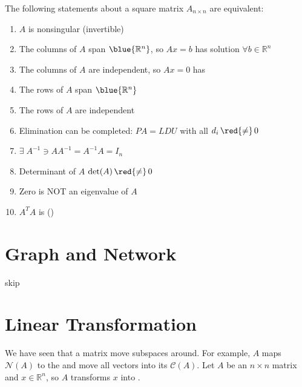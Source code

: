 \newpage

\begin{note}
    The following statements about a square matrix $A_{n \times n}$ are equivalent:
    \begin{enumerate}[label=(\arabic*)]
        \item $A$ is nonsingular (invertible)
        \item The columns of $A$ span $\blue{\mathbb{R}^n}$, so $Ax = b$ has  solution $\forall b \in \mathbb{R}^n$
        \item The columns of $A$ are independent, so $Ax = 0$ has 
        \item The rows of $A$ span $\blue{\mathbb{R}^n}$
        \item The rows of $A$ are independent
        \item Elimination can be completed: $PA = LDU$ with all $d_i\, \red{\neq}\, 0$
        \item $\exists\; A^{-1} \ni AA^{-1} = A^{-1}A = I_n$
        \item Determinant of $A$ $\det(A)\, \red{\neq}\, 0$
        \item Zero is NOT an eigenvalue of $A$
        \item $A^TA$ is  ()
    \end{enumerate}
\end{note}

\section{Graph and Network}
skip

\section{Linear Transformation}
We have seen that a matrix move subspaces around. For example, $A$ maps $\mathcal{N}(A)$ to the  and move all vectors into its  $\mathcal{C}(A)$. Let $A$ be an $n \times n$ matrix and $x \in \mathbb{R}^n$, so $A$ transforms $x$ into .

